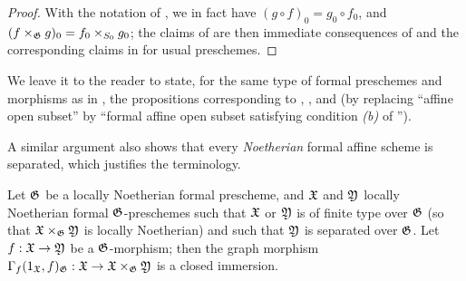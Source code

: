 \begin{proof}
\label{proof-1.10.15.3}
With the notation of , we in fact have $(g\circ f)_0=g_0\circ f_0$, and $(f\times_\mathfrak{G}g)_0=f_0\times_{S_0}g_0$;
the claims of  are then immediate consequences of  and the corresponding claims in  for usual preschemes.
\end{proof}

We leave it to the reader to state, for the same type of formal preschemes and morphisms as in , the propositions corresponding to , , and 
(by replacing ``affine open subset'' by ``formal affine open subset satisfying condition \emph{(b)} of '').

A similar argument also shows that every \emph{Noetherian} formal affine scheme is separated, which justifies the terminology.

\begin{prop}[10.15.4]
\label{1.10.15.4}
Let $\mathfrak{G}$ be a locally Noetherian formal prescheme, and $\mathfrak{X}$ and $\mathfrak{Y}$ locally Noetherian formal $\mathfrak{G}$-preschemes such that $\mathfrak{X}$ or $\mathfrak{Y}$ is of finite type over $\mathfrak{G}$ (so that $\mathfrak{X}\times_\mathfrak{G}\mathfrak{Y}$ is locally Noetherian) and such that $\mathfrak{Y}$ is separated over $\mathfrak{G}$.
Let $f:\fk{X}\to\fk{Y}$ be a $\mathfrak{G}$-morphism;
then the graph morphism $\Gamma_f(1_\fk{X},f)_\fk{G}:\fk{X}\to\fk{X}\times_\fk{G}\fk{Y}$ is a closed immersion.
\end{prop}

